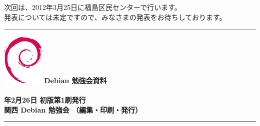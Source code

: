 \documentclass[mingoth,a4paper]{jsarticle}
\newcommand{\debmtgyear}{2012}
\newcommand{\debmtgdate}{26}
\newcommand{\debmtgmonth}{2}
\begin{document}
次回は、2012年3月25日に福島区民センターで行います。\\
発表については未定ですので、みなさまの発表をお待ちしております。



\printindex
 \cleartooddpage

 \begin{minipage}[b]{0.2\hsize}
 \end{minipage}
 \begin{minipage}[b]{0.8\hsize}

 \vspace*{15cm}
 \rule{\hsize}{1mm}
 \vspace{2mm}
 \includegraphics[width=2cm]{image200502/openlogo-nd.eps}
 \noindent \Large \bf Debian 勉強会資料\\ \\
 \noindent \normalfont \debmtgyear{}年\debmtgmonth{}月\debmtgdate{}日 \hspace{5mm}  初版第1刷発行\\
 \noindent \normalfont 関西 Debian 勉強会 （編集・印刷・発行）\\
 \rule{\hsize}{1mm}
 \end{minipage}
\end{document}
